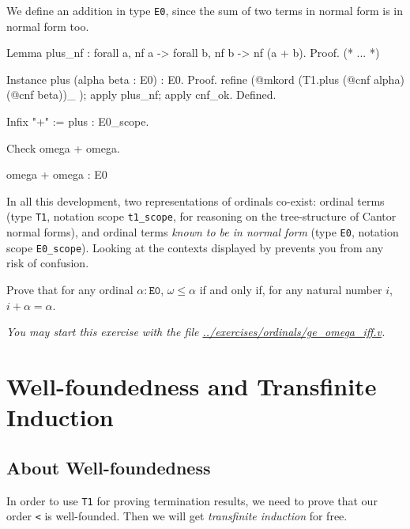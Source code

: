  We define an addition in type \texttt{E0}, since the sum of two terms in normal form is in normal form too.


\begin{Coqsrc}
Lemma plus_nf : forall a,  nf a -> forall b, nf b -> nf (a + b).
Proof.
 (* ... *)

Instance plus (alpha beta : E0) : E0.
Proof.
  refine (@mkord (T1.plus (@cnf alpha) (@cnf beta))_ );
    apply plus_nf; apply cnf_ok.
Defined.

Infix "+" := plus : E0_scope.

Check omega + omega.
\end{Coqsrc}

\begin{Coqanswer}
omega + omega
     : E0
\end{Coqanswer}

\begin{remark}
In all this development, two representations of ordinals co-exist: ordinal terms (type \texttt{T1}, notation scope \texttt{t1\_scope}, for reasoning on the tree-structure of Cantor normal forms), and ordinal terms \emph{known to be in normal form} (type \texttt{E0}, notation scope \texttt{E0\_scope}). Looking at the contexts displayed by \coq{} prevents you from any risk of confusion.
\end{remark}

\begin{exercise}
Prove that for any ordinal $\alpha:\texttt{E0}$, 
$\omega\leq \alpha$ if and only if, for any natural number $i$,
$i+\alpha=\alpha$.

\emph{You may start this exercise with the file
\url{../exercises/ordinals/ge_omega_iff.v}.}
\end{exercise}

\section{Well-foundedness and Transfinite Induction}


\subsection{About  Well-foundedness}
\label{sec:orgheadline82}
   In order to use \texttt{T1} for proving termination results,
we need to prove that  our order \texttt{<} is well-founded. Then we will get \emph{transfinite induction} for free.


